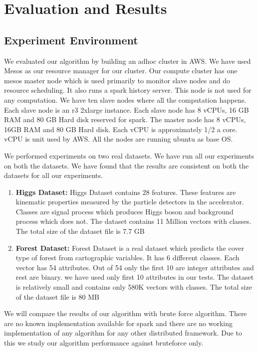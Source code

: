 \chapter{Evaluation and Results} \label{chap:Evaluation and Results}

\section{Experiment Environment}

We evaluated our algorithm by building an adhoc cluster in AWS. We
have used Mesos as our resource manager for our cluster. Our compute
cluster has one mesos master node which is used
primarily to monitor slave nodes and do resource scheduling.
It also runs a spark history server. This node is not used for any computation.
We have ten slave nodes where all the computation happens. Each slave
node is an r3 2xlarge instance. Each slave node has
8 vCPUs, 16 GB RAM and 80 GB Hard disk reserved for spark. The master node has 8 vCPUs,
16GB RAM and 80 GB Hard disk. Each vCPU is approximately 1/2 a
core. vCPU is unit used by AWS. All the nodes are running ubuntu as
base OS.

We performed experiments on two real datasets. We have run all our
experiments on both the datasets. We have found that the results are
consistent on both the datasets for all our experiments.

\begin{enumerate}
\item \textbf{Higgs Dataset:}
Higgs Dataset contains 28 features. These features are kinematic
properties measured by the particle detectors in the
accelerator. Classes are signal process which produces Higgs boson and
background process which does not. The dataset contains 11 Million
vectors with classes. The total size of the dataset file is 7.7 GB

\item \textbf{Forest Dataset:}
Forest Dataset is a real dataset which predicts the cover type of
forest from cartographic variables. It has 6 different classes. Each
vector has 54 attributes. Out of 54 only the first 10 are integer
attributes and rest are binary. we have used only first 10 attributes
in our tests. The dataset is relatively small and contains only 580K
vectors with classes. The total size of the dataset file is 80 MB
\end{enumerate}

We will compare the results of our algorithm with brute force
algorithm. There are no known implementation available for spark and
there are no working implementation of any algorithm for any other
distributed framework. Due to this we study our algorithm performance
against bruteforce only.

